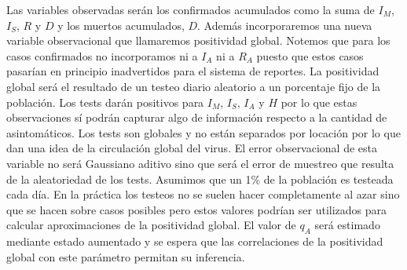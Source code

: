 Las variables observadas serán los confirmados acumulados como la suma de $I_M$, $I_S$, $R$ y $D$ y los muertos acumulados, $D$. Además incorporaremos una nueva variable observacional que llamaremos positividad global. Notemos que para los casos confirmados no incorporamos ni a $I_A$ ni a $R_A$ puesto que estos casos pasarían en principio inadvertidos para el sistema de reportes. La positividad global será el resultado de un testeo diario aleatorio a un porcentaje fijo de la población. Los tests darán positivos para $I_M$, $I_S$, $I_A$ y $H$ por lo que estas observaciones sí podrán capturar algo de información respecto a la cantidad de asintomáticos. Los tests son globales y no están separados por locación por lo que dan una idea de la circulación global del virus. El error observacional de esta variable no será Gaussiano aditivo sino que será el error de muestreo que resulta de la aleatoriedad de los tests. Asumimos que un 1\% de la población es testeada cada día. En la práctica los testeos no se suelen hacer completamente al azar sino que se hacen sobre casos posibles pero estos valores podrían ser utilizados para calcular aproximaciones de la positividad global. El valor de $q_A$ será estimado mediante estado aumentado y se espera que las correlaciones de la positividad global con este parámetro permitan su inferencia.

